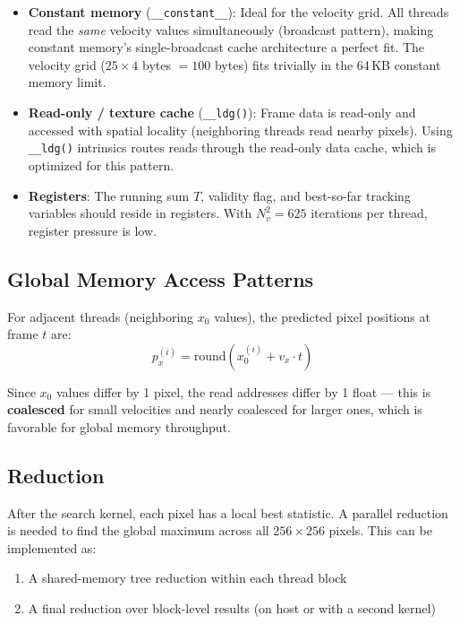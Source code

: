 \documentclass[11pt,letterpaper]{article}
\begin{document}
\begin{itemize}[leftmargin=2em]
    \item \textbf{Constant memory} (\texttt{\_\_constant\_\_}): Ideal for
    the velocity grid. All threads read the \emph{same} velocity values
    simultaneously (broadcast pattern), making constant memory's single-broadcast
    cache architecture a perfect fit. The velocity grid ($25 \times 4$
    bytes $= 100$ bytes) fits trivially in the 64\,KB constant memory limit.

    \item \textbf{Read-only / texture cache} (\texttt{\_\_ldg()}): Frame
    data is read-only and accessed with spatial locality (neighboring threads
    read nearby pixels). Using \texttt{\_\_ldg()} intrinsics routes reads
    through the read-only data cache, which is optimized for this pattern.

    \item \textbf{Registers}: The running sum $T$, validity flag, and
    best-so-far tracking variables should reside in registers. With $N_v^2 = 625$
    iterations per thread, register pressure is low.
\end{itemize}

\subsection{Global Memory Access Patterns}

For adjacent threads (neighboring $x_0$ values), the predicted pixel positions
at frame $t$ are:
\begin{equation}
    p_x^{(i)} = \mathrm{round}(x_0^{(i)} + v_x \cdot t)
\end{equation}

Since $x_0$ values differ by 1 pixel, the read addresses differ by 1 float
--- this is \textbf{coalesced} for small velocities and nearly coalesced for
larger ones, which is favorable for global memory throughput.

\subsection{Reduction}
\label{item:reduction}

After the search kernel, each pixel has a local best statistic. A parallel
reduction is needed to find the global maximum across all $256 \times 256$
pixels. This can be implemented as:
\begin{enumerate}[leftmargin=2em]
    \item A shared-memory tree reduction within each thread block
    \item A final reduction over block-level results (on host or with a
    second kernel)
\end{enumerate}
\end{document}
